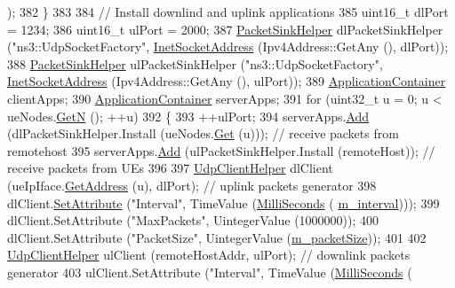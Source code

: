\begin{DoxyCode}
      );  
382     \}
383 
384   \textcolor{comment}{// Install downlind and uplink applications}
385   uint16\_t dlPort = 1234;
386   uint16\_t ulPort = 2000;
387   \hyperlink{classns3_1_1PacketSinkHelper}{PacketSinkHelper} dlPacketSinkHelper (\textcolor{stringliteral}{"ns3::UdpSocketFactory"}, 
      \hyperlink{classns3_1_1InetSocketAddress}{InetSocketAddress} (Ipv4Address::GetAny (), dlPort));
388   \hyperlink{classns3_1_1PacketSinkHelper}{PacketSinkHelper} ulPacketSinkHelper (\textcolor{stringliteral}{"ns3::UdpSocketFactory"}, 
      \hyperlink{classns3_1_1InetSocketAddress}{InetSocketAddress} (Ipv4Address::GetAny (), ulPort));
389   \hyperlink{classns3_1_1ApplicationContainer}{ApplicationContainer} clientApps;
390   \hyperlink{classns3_1_1ApplicationContainer}{ApplicationContainer} serverApps;
391   \textcolor{keywordflow}{for} (uint32\_t u = 0; u < ueNodes.\hyperlink{classns3_1_1NodeContainer_aed647ac56d0407a7706aba02eb44b951}{GetN} (); ++u)
392     \{
393       ++ulPort;
394       serverApps.\hyperlink{classns3_1_1ApplicationContainer_ad09ab1a1ad5849d518d5f4c262e38152}{Add} (dlPacketSinkHelper.Install (ueNodes.\hyperlink{classns3_1_1NodeContainer_a9ed96e2ecc22e0f5a3d4842eb9bf90bf}{Get} (u))); \textcolor{comment}{// receive packets from
       remotehost}
395       serverApps.\hyperlink{classns3_1_1ApplicationContainer_ad09ab1a1ad5849d518d5f4c262e38152}{Add} (ulPacketSinkHelper.Install (remoteHost));  \textcolor{comment}{// receive packets from UEs}
396 
397       \hyperlink{classns3_1_1UdpClientHelper}{UdpClientHelper} dlClient (ueIpIface.\hyperlink{classns3_1_1Ipv4InterfaceContainer_ae63208dcd222be986822937ee4aa828c}{GetAddress} (u), dlPort); \textcolor{comment}{// uplink
       packets generator}
398       dlClient.\hyperlink{classns3_1_1UdpClientHelper_a8bbae16a28f85ab3f3b5aa4642edfeae}{SetAttribute} (\textcolor{stringliteral}{"Interval"}, TimeValue (\hyperlink{group__timecivil_gaf26127cf4571146b83a92ee18679c7a9}{MilliSeconds} (
      \hyperlink{classLenaCqaFfMacSchedulerTestCase1_a1fe70b0e82d40f8e0a6cdc64a6ccf75d}{m\_interval})));
399       dlClient.SetAttribute (\textcolor{stringliteral}{"MaxPackets"}, UintegerValue (1000000));
400       dlClient.SetAttribute (\textcolor{stringliteral}{"PacketSize"}, UintegerValue (\hyperlink{classLenaCqaFfMacSchedulerTestCase1_a5f070f8da521f4003c049f67b62b7b5b}{m\_packetSize}));
401 
402       \hyperlink{classns3_1_1UdpClientHelper}{UdpClientHelper} ulClient (remoteHostAddr, ulPort);           \textcolor{comment}{// downlink packets
       generator}
403       ulClient.SetAttribute (\textcolor{stringliteral}{"Interval"}, TimeValue (\hyperlink{group__timecivil_gaf26127cf4571146b83a92ee18679c7a9}{MilliSeconds} (

\end{DoxyCode}
